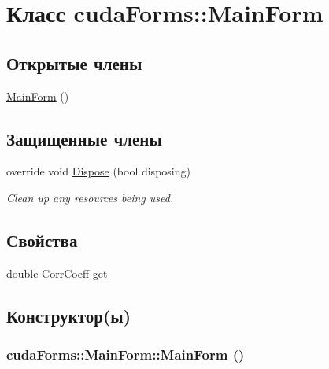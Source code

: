 \hypertarget{classcuda_forms_1_1_main_form}{
\section{Класс cudaForms::MainForm}
\label{classcuda_forms_1_1_main_form}
}
\subsection*{Открытые члены}
\begin{CompactItemize}
\item 
\hyperlink{classcuda_forms_1_1_main_form_c86a050d12cacdb42522109fe844bc01}{MainForm} ()
\end{CompactItemize}
\subsection*{Защищенные члены}
\begin{CompactItemize}
\item 
override void \hyperlink{classcuda_forms_1_1_main_form_53bc9d36391d1bf66e486637ea5b954e}{Dispose} (bool disposing)
\begin{CompactList}\small\item\em Clean up any resources being used. \item\end{CompactList}\end{CompactItemize}
\subsection*{Свойства}
\begin{CompactItemize}
\item 
double CorrCoeff \hyperlink{classcuda_forms_1_1_main_form_0f9ce11f800b8b2cf36bb8ac10e8d248}{get}
\end{CompactItemize}


\subsection{Конструктор(ы)}
\hypertarget{classcuda_forms_1_1_main_form_c86a050d12cacdb42522109fe844bc01}{
\subsubsection[{MainForm}]{\setlength{\rightskip}{0pt plus 5cm}cudaForms::MainForm::MainForm ()}}
\label{classcuda_forms_1_1_main_form_c86a050d12cacdb42522109fe844bc01}




